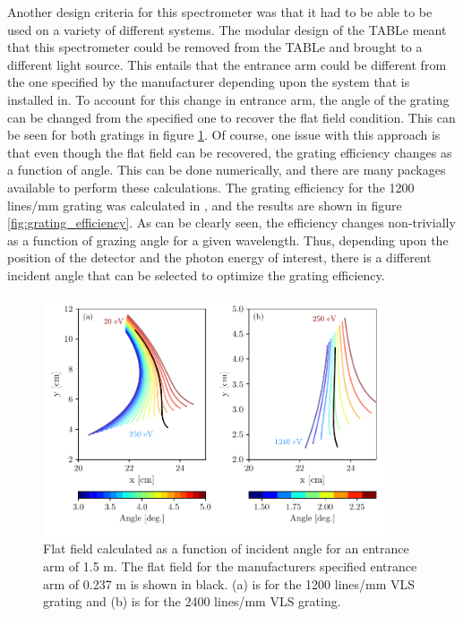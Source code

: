 Another design criteria for this spectrometer was that it had to be able to be used on a variety of different systems.  The modular design of the TABLe meant that this spectrometer could be removed from the TABLe and brought to a different light source.  This entails that the entrance arm could be different from the one specified by the manufacturer depending upon the system that is installed in.  To account for this change in entrance arm, the angle of the grating can be changed from the specified one to recover the flat field condition.  This can be seen for both gratings in figure \ref{fig:variable_flat_field}.  Of course, one issue with this approach is that even though the flat field can be recovered, the grating efficiency changes as a function of angle.  This can be done numerically, and there are many packages available to perform these calculations. The grating efficiency for the 1200 lines/mm grating was calculated in \cite{hageDevelopmentXUVSpectrometer}, and the results are shown in figure \ref{fig:grating_efficiency}.  As can be clearly seen, the efficiency changes non-trivially as a function of grazing angle for a given wavelength.  Thus, depending upon the position of the detector and the photon energy of interest, there is a different incident angle that can be selected to optimize the grating efficiency.
\begin{figure}
	\centering
	\includegraphics[width=0.9\textwidth]{figures/Beamline/variable_flat_field.pdf}
	\caption[Flat field of both VLS gratings as a function of input angle]{Flat field calculated as a function of incident angle for an entrance arm of 1.5 m.  The flat field for the manufacturers specified entrance arm of 0.237 m is shown in black. (a) is for the 1200 lines/mm VLS grating and (b) is for the 2400 lines/mm VLS grating. }
	\label{fig:variable_flat_field}
\end{figure}

